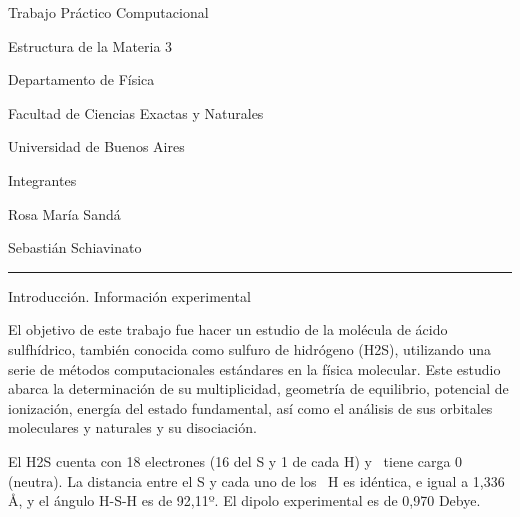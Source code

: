 \documentclass[]{article}
\date{}
\begin{document}
{Trabajo Práctico Computacional}

{}

{Estructura de la Materia 3}

{Departamento de Física}

{Facultad de Ciencias Exactas y Naturales}

{Universidad de Buenos Aires}

{}

{}

{}

{}

{}

{}

{}

{}

{}

{}

{}

{}

{}

{}

{}

{}

{}

{}

{}

{}

{}

{}

{}

{Integrantes}

{Rosa María Sandá}

{Sebastián Schiavinato}

\begin{center}\rule{0.5\linewidth}{\linethickness}\end{center}

{Introducción. Información experimental}

{El objetivo de este trabajo fue hacer un estudio de la molécula de
ácido sulfhídrico, también conocida como sulfuro de hidrógeno (H}{2}{S),
utilizando una serie de métodos computacionales estándares en la física
molecular. Este estudio abarca la determinación de su multiplicidad,
geometría de equilibrio, potencial de ionización, energía del estado
fundamental, así como el análisis de sus orbitales moleculares y
naturales y su disociación.}

{El H}{2}{S cuenta con 18 electrones (16 del S y 1 de cada H) y ~tiene
carga 0 (neutra). La distancia entre el S y cada uno de los ~H es
idéntica, e igual a 1,336 Å, y el ángulo H-S-H es de 92,11º. El dipolo
experimental es de 0,970 Debye.}
\end{document}
